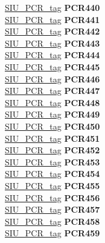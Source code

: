 \begin{DoxyCompactItemize}
\begin{tabbing}
\>\>\mbox{\hyperlink{unionSIU__tag_1_1SIU__PCR__tag}{SIU\_PCR\_tag}} {\bfseries PCR440}\\
\>\>\mbox{\hyperlink{unionSIU__tag_1_1SIU__PCR__tag}{SIU\_PCR\_tag}} {\bfseries PCR441}\\
\>\>\mbox{\hyperlink{unionSIU__tag_1_1SIU__PCR__tag}{SIU\_PCR\_tag}} {\bfseries PCR442}\\
\>\>\mbox{\hyperlink{unionSIU__tag_1_1SIU__PCR__tag}{SIU\_PCR\_tag}} {\bfseries PCR443}\\
\>\>\mbox{\hyperlink{unionSIU__tag_1_1SIU__PCR__tag}{SIU\_PCR\_tag}} {\bfseries PCR444}\\
\>\>\mbox{\hyperlink{unionSIU__tag_1_1SIU__PCR__tag}{SIU\_PCR\_tag}} {\bfseries PCR445}\\
\>\>\mbox{\hyperlink{unionSIU__tag_1_1SIU__PCR__tag}{SIU\_PCR\_tag}} {\bfseries PCR446}\\
\>\>\mbox{\hyperlink{unionSIU__tag_1_1SIU__PCR__tag}{SIU\_PCR\_tag}} {\bfseries PCR447}\\
\>\>\mbox{\hyperlink{unionSIU__tag_1_1SIU__PCR__tag}{SIU\_PCR\_tag}} {\bfseries PCR448}\\
\>\>\mbox{\hyperlink{unionSIU__tag_1_1SIU__PCR__tag}{SIU\_PCR\_tag}} {\bfseries PCR449}\\
\>\>\mbox{\hyperlink{unionSIU__tag_1_1SIU__PCR__tag}{SIU\_PCR\_tag}} {\bfseries PCR450}\\
\>\>\mbox{\hyperlink{unionSIU__tag_1_1SIU__PCR__tag}{SIU\_PCR\_tag}} {\bfseries PCR451}\\
\>\>\mbox{\hyperlink{unionSIU__tag_1_1SIU__PCR__tag}{SIU\_PCR\_tag}} {\bfseries PCR452}\\
\>\>\mbox{\hyperlink{unionSIU__tag_1_1SIU__PCR__tag}{SIU\_PCR\_tag}} {\bfseries PCR453}\\
\>\>\mbox{\hyperlink{unionSIU__tag_1_1SIU__PCR__tag}{SIU\_PCR\_tag}} {\bfseries PCR454}\\
\>\>\mbox{\hyperlink{unionSIU__tag_1_1SIU__PCR__tag}{SIU\_PCR\_tag}} {\bfseries PCR455}\\
\>\>\mbox{\hyperlink{unionSIU__tag_1_1SIU__PCR__tag}{SIU\_PCR\_tag}} {\bfseries PCR456}\\
\>\>\mbox{\hyperlink{unionSIU__tag_1_1SIU__PCR__tag}{SIU\_PCR\_tag}} {\bfseries PCR457}\\
\>\>\mbox{\hyperlink{unionSIU__tag_1_1SIU__PCR__tag}{SIU\_PCR\_tag}} {\bfseries PCR458}\\
\>\>\mbox{\hyperlink{unionSIU__tag_1_1SIU__PCR__tag}{SIU\_PCR\_tag}} {\bfseries PCR459}\\

\end{tabbing}
\end{DoxyCompactItemize}
